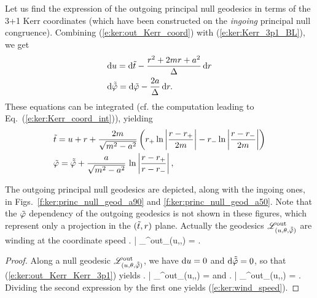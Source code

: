 Let us find
the expression of the outgoing principal null geodesics in terms of
the 3+1 Kerr coordinates (which have been constructed on the
\emph{ingoing} principal null congruence).
Combining (\ref{e:ker:out_Kerr_coord}) with (\ref{e:ker:Kerr_3p1_BL}),
we get
\begin{subequations}
\label{e:ker:out_Kerr_Kerr_3p1}
\begin{align}
& \mathrm{d} u = \mathrm{d} {\tilde t} - \frac{r^2 + 2m r + a^2}{\Delta} \, \mathrm{d} r \\
& \mathrm{d} \tilde{{\tilde\varphi}} = \mathrm{d} {\tilde\varphi} - \frac{2a}{\Delta}\, \mathrm{d} r .
\end{align}
\end{subequations}
These equations can be integrated (cf. the computation leading to Eq.~(\ref{e:ker:Kerr_coord_int})), yielding
\begin{subequations}
\label{e:ker:out_princ_geod}
\begin{align}
& {\tilde t} = u + r + \frac{2m}{\sqrt{m^2-a^2}} \left(
    r_+ \ln\left| \frac{r-r_+}{2m} \right|
    - r_- \ln\left| \frac{r-r_-}{2m} \right| \right) \\
&  {\tilde\varphi} = \tilde{{\tilde\varphi}} + \frac{a}{\sqrt{m^2-a^2}}\, \ln \left|
    \frac{r-r_+}{r-r_-} \right|  ,
\end{align}
\end{subequations}

The outgoing principal null geodesics are depicted, along with the
ingoing ones, in Figs.~\ref{f:ker:princ_null_geod_a90} and
\ref{f:ker:princ_null_geod_a50}. Note that the ${\tilde\varphi}$ dependency of the
outgoing geodesics is not shown in these figures, which represent only a projection
in the $({\tilde t},r)$ plane. Actually the geodesics $\mathscr{L}^{\rm out}_{(u,\theta,\tilde{{\tilde\varphi}})}$
are winding at the coordinate speed
\be \label{e:ker:wind_speed}
    \left. \frac{\D\tph}{\D\ti} \right| _{\Li^{\rm out}_{(u,\th,\tilde{\tph})}} =
     .
\ee
\begin{proof}
Along a null geodesic $\mathscr{L}^{\rm out}_{(u,\theta,\tilde{{\tilde\varphi}})}$, we have
$\mathrm{d} u = 0$ and $\mathrm{d}\tilde{{\tilde\varphi}}=0$, so that (\ref{e:ker:out_Kerr_Kerr_3p1}) yields
\be \label{e:ker:dtdr_dphdr_out}
\left.  \right| _{\Li^{\rm out}_{(u,\th,\tilde{\tph})}}  =     \qquad\mbox{and}\qquad
\left.  \right| _{\Li^{\rm out}_{(u,\th,\tilde{\tph})}} =  .
\ee
Dividing the second expression by the first one yields (\ref{e:ker:wind_speed}).
\end{proof}

